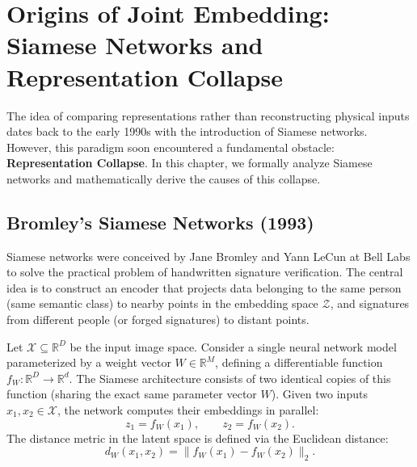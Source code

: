 \documentclass[11pt, oneside, openany]{book}
\begin{document}
\chapter{Origins of Joint Embedding: Siamese Networks and Representation Collapse}
\label{chap:3}

The idea of comparing representations rather than reconstructing physical inputs dates back to the early 1990s with the introduction of Siamese networks. However, this paradigm soon encountered a fundamental obstacle: \textbf{Representation Collapse}. In this chapter, we formally analyze Siamese networks and mathematically derive the causes of this collapse.

\section{Bromley's Siamese Networks (1993)}
\label{sec:3.1}

Siamese networks were conceived by Jane Bromley and Yann LeCun at Bell Labs \cite{bromley1993signature} to solve the practical problem of handwritten signature verification. The central idea is to construct an encoder that projects data belonging to the same person (same semantic class) to nearby points in the embedding space $\mathcal{Z}$, and signatures from different people (or forged signatures) to distant points.

\begin{definition}
\label{def:3.1}
Let $\mathcal{X} \subseteq \mathbb{R}^{D}$ be the input image space. Consider a single neural network model parameterized by a weight vector $W \in \mathbb{R}^{M}$, defining a differentiable function $f_{W} \colon \mathbb{R}^{D} \to \mathbb{R}^{d}$. The Siamese architecture consists of two identical copies of this function (sharing the exact same parameter vector $W$). Given two inputs $x_{1}, x_{2} \in \mathcal{X}$, the network computes their embeddings in parallel:
\begin{equation}
\label{eq:3.1}
z_{1} = f_{W}(x_{1}), \qquad z_{2} = f_{W}(x_{2}).
\end{equation}
The distance metric in the latent space is defined via the Euclidean distance:
\begin{equation}
\label{eq:3.2}
d_{W}(x_{1}, x_{2}) = \lVert f_{W}(x_{1}) - f_{W}(x_{2}) \rVert_{2}.
\end{equation}
\end{definition}
\end{document}
